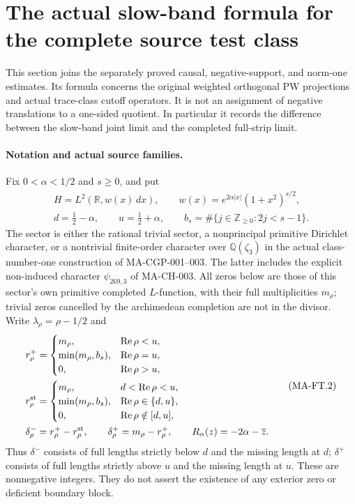 \section{The actual slow-band formula for the complete source test class}
\label{sec:full-test-slow-band}

This section joins the separately proved causal, negative-support,
and norm-one estimates.  Its formula concerns the original weighted
orthogonal PW projections and actual trace-class cutoff operators.
It is not an assignment of negative translations to a one-sided
quotient.  In particular it records the difference between the
slow-band joint limit and the completed full-strip limit.

\paragraph{Notation and actual source families.}
Fix $0<\alpha<1/2$ and $s\ge0$, and put
\[
 \begin{gathered}
 H=L^2(\mathbb R,w(x)\,dx),\qquad
 w(x)=e^{2\alpha|x|}(1+x^2)^{s/2},\\
 d=\tfrac12-\alpha,\qquad u=\tfrac12+\alpha,
 \qquad b_s=\#\{j\in\mathbb Z_{\ge0}:2j<s-1\}.
 \end{gathered}
 \tag{MA-FT.1}
\]
The sector is either the rational trivial sector, a nonprincipal
primitive Dirichlet character, or a nontrivial finite-order
character over $\mathbb Q(\zeta_3)$ in the actual class-number-one
construction of MA-CGP-001--003.  The latter includes the explicit
non-induced character $\psi_{269,3}$ of MA-CH-003.
All zeros below are those of this sector's own primitive completed
$L$-function, with their full multiplicities $m_\rho$; trivial zeros
cancelled by the archimedean completion are not in the divisor.
Write $\lambda_\rho=\rho-1/2$ and
\[
 \begin{aligned}
 r_\rho^+&=
 \begin{cases}
 m_\rho,&\operatorname{Re}\rho<u,\\
 \min(m_\rho,b_s),&\operatorname{Re}\rho=u,\\
 0,&\operatorname{Re}\rho>u,
 \end{cases}\\
 r_\rho^{\rm st}&=
 \begin{cases}
 m_\rho,&d<\operatorname{Re}\rho<u,\\
 \min(m_\rho,b_s),&\operatorname{Re}\rho\in\{d,u\},\\
 0,&\operatorname{Re}\rho\notin[d,u],
 \end{cases}\\
 \delta_\rho^-&=r_\rho^+-r_\rho^{\rm st},\qquad
 \delta_\rho^+=m_\rho-r_\rho^+,\qquad
 R_\alpha(z)=-2\alpha-\overline z.
 \end{aligned}
 \tag{MA-FT.2}
\]
Thus $\delta^-$ consists of full lengths strictly below $d$ and
the missing length at $d$; $\delta^+$ consists of full lengths
strictly above $u$ and the missing length at $u$.
These are nonnegative integers.  They do not assert the existence
of any exterior zero or deficient boundary block.

